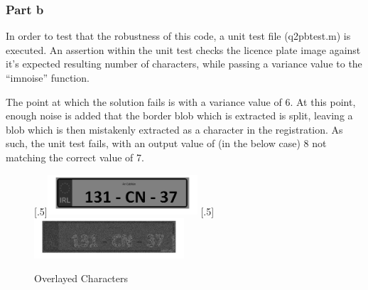 \documentclass[a4paper]{article}
\begin{document}
	\subsubsection{Part b}
	In order to test that the robustness of this code, a unit test file
	(q2pbtest.m) is executed. An assertion within the unit test checks the
	licence plate image against it's expected resulting number of
	characters, while passing a variance value to the ``imnoise'' function.
	\par The point at which the solution fails is with a variance value of
	6. At this point, enough noise is added that the border blob which is
	extracted is split, leaving a blob which is then mistakenly extracted as
	a character in the registration. As such, the unit test fails, with an
	output value of (in the below case) 8 not matching the correct value of
	7.
	\begin{figure}[H]
		\centering
		[.5\linewidth]{\includegraphics[height=1.5cm]{Results/Q2/NumPlate1/qanumber_plate_1Overlay.jpg}}%
		[.5\linewidth]{\includegraphics[height=1.5cm]{Results/Q2/noiseVar6Overlay.jpg}}%
		\caption{Overlayed Characters}
		\label{fig:}
	\end{figure}
\end{document}
